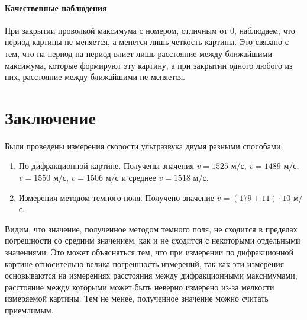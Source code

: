 \documentclass[a4paper,12pt]{article}
\newcommand{\n}{\hfill \break}
\begin{document}
\paragraph{Качественные наблюдения}
\n
При закрытии проволкой максимума с номером, отличным от 0, наблюдаем, что период картины не меняется, а менется лишь четкость картины. Это связано с тем, что на период на период влиет лишь расстояние между ближайшими максимума, которые формируют эту картину, а при закрытии одного любого из них, расстояние между ближайшими не меняется.

\pagebreak

\section*{Заключение}
Были проведены измерения скорости ультразвука двумя разными способами:
\begin{enumerate}
    \item По дифракционной картине. Получены значения $v = 1525$ м/с, $v = 1489$ м/с, $v = 1550$ м/с, $v = 1506$ м/с и среднее $v = 1518$ м/с.
    \item Измерения методом темного поля. Получено значение $v = (179 \pm 11) \cdot 10 $ м/с.
\end{enumerate}
Видим, что значение, полученное методом темного поля, не сходится в пределах погрешности со средним значением, как и не сходится с некоторыми отдельными значениями. Это может объясняться тем, что при измерении по дифракционной картине относительно велика погрешность измерений, так как эти измерения основываются на измерениях расстояния между дифракционными максимумами, расстояние между которыми может быть неверно измерено из-за мелкости измеряемой картины. Тем не менее, полученное значение можно считать приемлимым.
\end{document}
